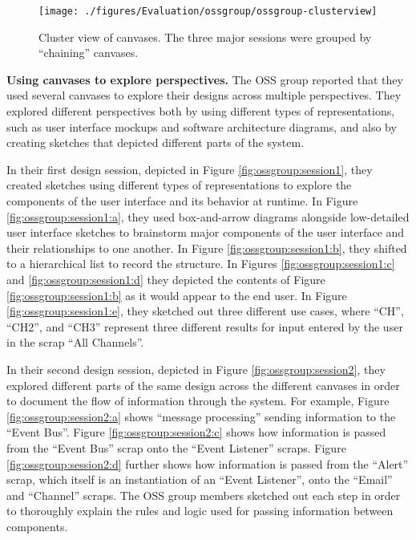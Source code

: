 \begin{figure}%
  \centering
  \texttt{[image: ./figures/Evaluation/ossgroup/ossgroup-clusterview]}
   \caption {Cluster view of canvases. The three major sessions were grouped by ``chaining'' canvases.}
   \label{fig:ossgroup:clusterview}   
\end{figure}%

\textbf{Using canvases to explore perspectives.} The OSS group reported that they used several canvases to explore their designs across multiple perspectives. They explored different perspectives both by using different types of representations, such as user interface mockups and software architecture diagrams, and also by creating sketches that depicted different parts of the system. 

In their first design session, depicted in Figure \ref{fig:ossgroup:session1}, they created sketches using different types of representations to explore the components of the user interface and its behavior at runtime. In Figure \ref{fig:ossgroup:session1:a}, they used box-and-arrow diagrams alongside low-detailed user interface sketches to brainstorm major components of the user interface and their relationships to one another. In Figure \ref{fig:ossgroup:session1:b}, they shifted to a hierarchical list to record the structure. In Figures \ref{fig:ossgroup:session1:c} and \ref{fig:ossgroup:session1:d} they depicted the contents of Figure \ref{fig:ossgroup:session1:b} as it would appear to the end user. In Figure \ref{fig:ossgroup:session1:e}, they sketched out three different use cases, where ``CH'', ``CH2'', and ``CH3'' represent three different results for input entered by the user in the scrap ``All Channels''.

In their second design session, depicted in Figure \ref{fig:ossgroup:session2}, they explored different parts of the same design across the different canvases in order to document the flow of information through the system. For example, Figure \ref{fig:ossgroup:session2:a} shows ``message processing'' sending information to the ``Event Bus''. Figure \ref{fig:ossgroup:session2:c} shows how information is passed from the ``Event Bus'' scrap onto the ``Event Listener'' scraps. Figure \ref{fig:ossgroup:session2:d} further shows how information is passed from the ``Alert'' scrap, which itself is an instantiation of an ``Event Listener'', onto the ``Email'' and ``Channel'' scraps. The OSS group members sketched out each step in order to thoroughly explain the rules and logic used for passing information between components. 

